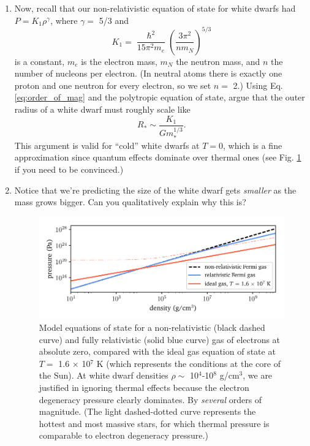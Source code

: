 \documentclass[11pt]{article}
\begin{document}
\begin{enumerate}
\item Now, recall that our non-relativistic equation of state for white dwarfs had $P = K_1\rho^{\gamma}$, where $\gamma =$ 5/3 and
\begin{equation}\label{eq:K1}
K_1 = \frac{\hslash^2}{15\pi^2m_e} \left( \frac{3\pi^2}{n m_N} \right)^{5/3}
\end{equation}
is a constant, $m_e$ is the electron mass, $m_N$ the neutron mass, and $n$ the number of nucleons per electron. (In neutral atoms there is exactly one proton and one neutron for every electron, so we set $n=$ 2.) Using Eq. \ref{eq:order_of_mag} and the polytropic equation of state, argue that the outer radius of a white dwarf must roughly scale like
\begin{equation}\label{eq:m_R_nonrel}
R_* \sim \frac{K_1}{Gm_*^{1/3}}.
\end{equation}
This argument is valid for ``cold'' white dwarfs at $T=0$, which is a fine approximation since quantum effects dominate over thermal ones (see Fig. \ref{fig:EOS} if you need to be convinced.)

\item Notice that we're predicting the size of the white dwarf gets \emph{smaller} as the mass grows bigger. Can you qualitatively explain why this is?

\begin{figure}[!t]
\begin{mdframed}
\centering
\includegraphics[scale=1]{white_dwarf/equation_of_state.pdf}
\caption{\label{fig:EOS} Model equations of state for a non-relativistic (black dashed curve) and fully relativistic (solid blue curve) gas of electrons at absolute zero, compared with the ideal gas equation of state at $T =$ 1.6 $\times$ 10$^7$ K (which represents the conditions at the core of the Sun). At white dwarf densities $\rho \sim$ 10$^4$-10$^8$ g/cm$^3$, we are justified in ignoring thermal effects because the electron degeneracy pressure clearly dominates. By \emph{several} orders of magnitude. (The light dashed-dotted curve represents the hottest and most massive stars, for which thermal pressure is comparable to electron degeneracy pressure.)}
\end{mdframed}
\end{figure}


\end{enumerate}
\end{document}
